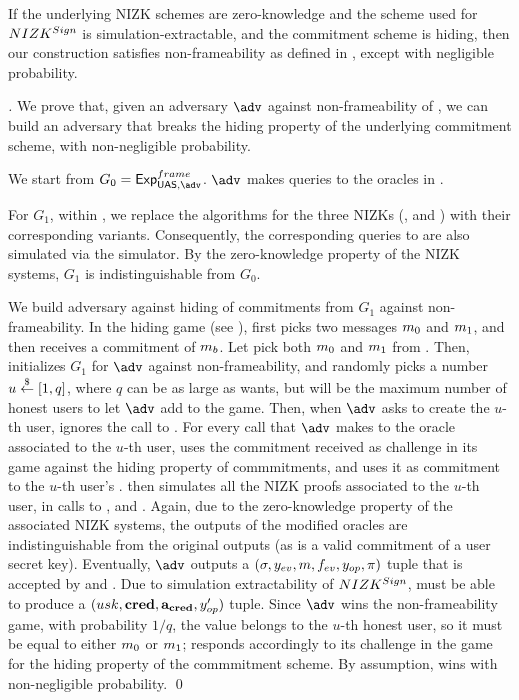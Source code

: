 \begin{theorem}
  \label{thm:frame-uas}
  If the underlying NIZK schemes are zero-knowledge and the scheme used for
  $NIZK^{Sign}$ is simulation-extractable, and the commitment scheme is
  hiding, then our \CUASGen construction satisfies non-frameability as defined
  in , except with negligible probability.
\end{theorem}

\begin{proof}[]
  We prove that, given an adversary $\adv$ against non-frameability of \CUASGen,
  we can build an adversary \advB that breaks the hiding property of the
  underlying commitment scheme, with non-negligible probability.

  We start from $G_0=\ExpNonframe$. $\adv$ makes queries to the oracles in
  \Oframe.

  For $G_1$, within \Setup, we replace the \Setup algorithms for the three
  NIZKs (\Issue, \Sign and \Inspect) with their corresponding \SimSetup
  variants. Consequently, the corresponding queries to \Prove are also
  simulated via the simulator. By the zero-knowledge property of the NIZK
  systems, $G_1$ is indistinguishable from $G_0$.
  
  We build adversary \advB against hiding of commitments from $G_1$ against
  non-frameability. In the hiding game (see ), \advB first
  picks two messages $m_0$ and $m_1$, and then receives a commitment \Ccom
  of $m_b$. Let \advB pick both $m_0$ and $m_1$ from \AttrSpace. Then,
  \advB initializes $G_1$ for $\adv$ against non-frameability, and randomly
  picks a number $u \stackrel{\$}{\gets} [1,q]$, where $q$ can be as large as \advB wants, but
  will be the maximum number of honest users to let $\adv$ add to the game.
  Then, when $\adv$ asks to create the $u$-th user, \advB ignores the call to
  \UKeyGen. For every call that $\adv$ makes to the \OBTAIN oracle associated to
  the $u$-th user, \advB uses the commitment \Ccom received as challenge in its
  game against the hiding property of commmitments, and uses it as commitment to
  the $u$-th user's \usk. \advB then simulates all the NIZK proofs associated to
  the $u$-th user, in calls to \OBTAIN, \SIGN and \INSPECT. Again, due to the
  zero-knowledge property of the associated NIZK systems, the outputs of the
  modified oracles are indistinguishable from the original outputs (as \Ccom
  is a valid commitment of a user secret key). Eventually, $\adv$ outputs a
  $(\sigma,y_{ev},m,f_{ev},y_{op},\pi)$ tuple that is accepted by \Verify
  and \Judge. Due to simulation extractability of $NIZK^{Sign}$, \ExtractSign
  must be able to produce a $(usk,\mathbf{cred},\mathbf{a}_{\mathbf{cred}},y_{op}')$ tuple. Since
  $\adv$ wins the non-frameability game, with probability $1/q$,
  the \usk value belongs to the $u$-th honest user, so it must be equal to
  either $m_0$ or $m_1$; \advB responds accordingly to its challenge in
  the game for the hiding property of the commmitment scheme. By assumption,
  \advB wins with non-negligible probability.
  \qed
\end{proof}


